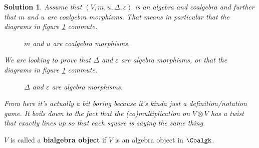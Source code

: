 \documentclass[12pt]{article}
\theoremstyle{break}
\theoremstyle{nonumberbreak}
\newtheorem{sol}{Solution}
\theoremstyle{changebreak}
\theoremstyle{break}
\theoremstyle{nonumberbreak}
\theoremstyle{nonumberplain}
\theoremstyle{change}
\begin{document}
\begin{sol}
	Assume that $(V,m,u,\Delta,\varepsilon)$ is an algebra and coalgebra and further that
	$m$ and $u$ are coalgebra morphisms. That means in particular that the diagrams in figure \ref{fig-coalg-mor} commute.
	\begin{figure}[h]\label{fig-coalg-mor}
		\centering
		\label{fig-coalg-mor}
		\caption{$m$ and $u$ are coalgebra morphisms.}
	\end{figure}

	We are looking to prove that $\Delta$ and $\varepsilon$ are algebra morphisms, or that 
	the diagrams in figure \ref{fig-coalg-mor}  commute.
	\begin{figure}[h]
		\centering
		\label{fig-alg-mor}
		\caption{$\Delta$ and $\varepsilon$ are algebra morphisms.}
	\end{figure}

	From here it's actually a bit boring because it's kinda just a definition/notation game.
	It boils down to the fact that the (co)multiplication on $V\otimes V$ has a twist that 
	exactly lines up so that each square is saying the same thing.
\end{sol}

\begin{defn}
	$V$ is called a \textbf{bialgebra object} if $V$ is an algebra object in $\Coalgk$.
\end{defn}
\end{document}
